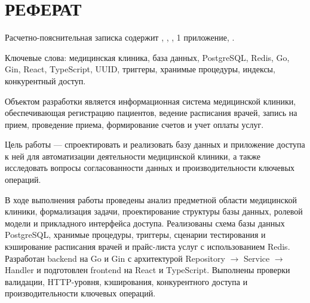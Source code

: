 \chapter*{РЕФЕРАТ}

Расчетно-пояснительная записка содержит , , , 1 приложение, .

Ключевые слова: медицинская клиника, база данных, PostgreSQL, Redis, Go, Gin, React, TypeScript, UUID, триггеры, хранимые процедуры, индексы, конкурентный доступ.

Объектом разработки является информационная система медицинской клиники, обеспечивающая регистрацию пациентов, ведение расписания врачей, запись на прием, проведение приема, формирование счетов и учет оплаты услуг.

Цель работы --- спроектировать и реализовать базу данных и приложение доступа к ней для автоматизации деятельности медицинской клиники, а также исследовать вопросы согласованности данных и производительности ключевых операций.

В ходе выполнения работы проведены анализ предметной области медицинской клиники, формализация задачи, проектирование структуры базы данных, ролевой модели и прикладного интерфейса доступа. Реализованы схема базы данных PostgreSQL, хранимые процедуры, триггеры, сценарии тестирования и кэширование расписания врачей и прайс-листа услуг с использованием Redis. Разработан backend на Go и Gin с архитектурой Repository $\rightarrow$ Service $\rightarrow$ Handler и подготовлен frontend на React и TypeScript. Выполнены проверки валидации, HTTP-уровня, кэширования, конкурентного доступа и производительности ключевых операций.

\clearpage
